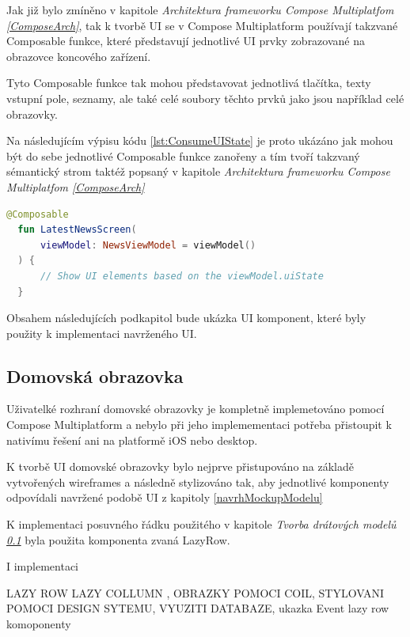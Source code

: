 Jak již bylo zmíněno v kapitole \textit{Architektura frameworku Compose Multiplatfom \ref{ComposeArch}}, tak k tvorbě UI se v Compose Multiplatform používají 
takzvané Composable funkce, které představují jednotlivé UI prvky zobrazované na obrazovce koncového zařízení. 

Tyto Composable funkce tak mohou představovat jednotlivá tlačítka, texty vstupní pole, seznamy, ale také celé soubory těchto prvků jako jsou 
například celé obrazovky.

Na následujícím výpisu kódu \ref{lst:ConsumeUIState} je proto ukázáno jak mohou být do sebe jednotlivé Composable funkce zanořeny a tím tvoří
takzvaný sémantický strom taktéž popsaný v kapitole \textit{Architektura frameworku Compose Multiplatfom \ref{ComposeArch}}

\begin{lstlisting}[caption={Popis UI widgetů pomocí jazyka Kotlin}, label={lst:ConsumeUIState}, language=Kotlin]
  @Composable
  fun LatestNewsScreen(
      viewModel: NewsViewModel = viewModel()
  ) {
      // Show UI elements based on the viewModel.uiState
  }
\end{lstlisting}




Obsahem následujících podkapitol bude ukázka UI komponent, které byly použity k implementaci navrženého UI.

\subsection{Domovská obrazovka}
Uživatelké rozhraní domovské obrazovky je kompletně implemetováno pomocí Compose Multiplatform a nebylo při jeho implemementaci potřeba
přistoupit k nativímu řešení ani na platformě iOS nebo desktop. 

K tvorbě UI domovské obrazovky bylo nejprve přistupováno na základě vytvořených wireframes a následně stylizováno tak, aby 
jednotlivé komponenty odpovídali navržené podobě UI z kapitoly \ref{navrhMockupModelu}

K implementaci posuvného řádku použitého v kapitole \textit{Tvorba drátových modelů \ref{}} byla použita komponenta zvaná LazyRow.


I implementaci 



LAZY ROW LAZY COLLUMN , OBRAZKY POMOCI COIL, STYLOVANI POMOCI DESIGN SYTEMU, VYUZITI DATABAZE, ukazka Event lazy row komoponenty

